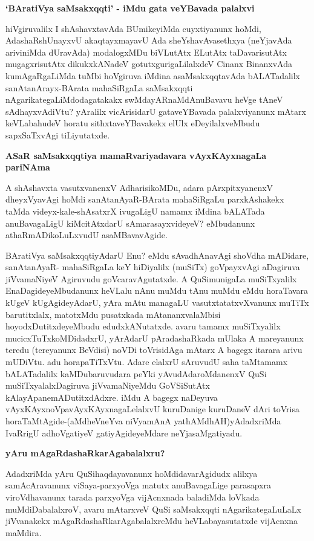 {\bigskip
\noindent
{\large\bf `BAratiVya saMsakxqqti' - iMdu gata veYBavada palalxvi}}\label{page23}
\medskip

\noindent
hiVgiruvalilx I shAshavxtavAda BUmikeyiMda cuyxtiyanunx hoMdi, AdashaR\-shUnayxvU akaqtayxmayavU Ada sheYshavAvasethxya (neYjavAda ariviniMda dUravAda) modalogxMDu biVLutAtx ELutAtx taDavari\-sutAtx mugagxrisutAtx dikukxkANadeV gotutx\-guri\-gaLilalxdeV Cinanx BinanxvAda kumAgaRgaLiMda tuMbi hoVgiruva iMdina asaMsakxqqta\-vAda bALATadalilx sanAtanArayx-BArata mahaSiRgaLa saMsakxqqti nAgarikategaLiMdodaga\-takakx swMdayARnaMdAnuBavavu heVge tAneV sAdhayxvAdiVtu? yAralilx vicArisi\-darU gataveYBavada palalxviyanunx mAtarx keVLabahudeV horatu sithxtaveYBavakekx elUlx eDeyilalxveMbudu sapxSaTxvAgi tiLiyu\-tatxde.

\newpage

{\medskip
\noindent
{\large\bf ASaR saMsakxqqtiya mamaRvariyadavara vAyxKAyxnagaLa pariNAma}}
\medskip

\noindent
A shAshavxta vasutxvanenxV AdharisikoMDu, adara pArxpitxyanenxV dheyxVyavAgi hoMdi sanAtanAyaR-\-BArata mahaSiRgaLu parxkAshakekx taMda videyx-kale-shAsatxrX ivugaLigU namamx iMdina bALATada anuBava\-gaLigU kiMci\-tAtxdarU sAmarasayxvideyeV? eMbudanunx athaRmADikoLuLxvudU asaMBavavAgide.

BAratiVya saMsakxqqtiyAdarU Enu? eMdu sAvadhAnavAgi shoVdha mADi\-dare, sanAtanAyaR-\- mahaSiRgaLa keY hiDiyalilx (muSiTx) goVpayxvAgi aDagiruva jiVvamaNiyeV Agiruvudu goVcara\-vAgu\-tatxde. A QuSimunigaLa muSiTxyalilx EnaDagideyeMbudanunx heVLalu nAnu muMdu tAnu muMdu eMdu horaTavara kUgeV kUgAgideyAdarU, yAra mAtu managaLU vasutxtatatxvXvanunx muTiTx baru\-titxlalx, matotxMdu pusatxkada mAtananxvalaMbisi hoyodxDutitxdeyeMbudu edudx\break kANutatxde. avaru tamamx muSiTxyalilx mucicxTuTxkoMDidadxrU, yArAdarU pAra\-dashaRkada mUlaka A mareyanunx teredu (tere\-yanunx BeVdisi) noVDi toVrisidAga mAtarx A bagegx itarara arivu mUDiVtu. adu hora\-paTiTxVtu. Adare elalxrU sAru\-vudU saha taMtamamx bALATadalilx kaMDubaruvudara peYki yAvu\-dAda\break\-roMdanenxV QuSi muSiTxyalalxDagiruva jiVvamaNiyeMdu GoVSiSutAtx kAla\break yApane\-mADu\-titxdAdxre. iMdu A bagegx naDeyuva vAyxKAyxnoVpavAyxKAyxna\-gaLelalxvU kuruDanige kuruDaneV dAri toVrisa horaTaMtA\-gide-(aMdheVneYva niVyamAnA yathAMdhAH\label{24})yAdadxriMda IvaRrigU adhoVgatiyeV gati\-yAgide\-yeMdare neYjasaMgatiyadu.

{\medskip
\noindent
{\large\bf yAru mAgaRdashaRkarAgabalalxru?}}
\medskip

\noindent
 AdadxriMda yAru QuSihaqdayavanunx hoMdidavarAgidudx alilxya samAcAra\-vanunx viSaya-parx\-yoVga matutx anuBavagaLige parasapxra viroVdhavanunx tarada parxyoVga vijAcnxnada baladiMda loVkada muMdiDa\-balalxroV, avaru mAtarxveV QuSi saMsakxqqti nAgarikategaLuLaLx jiVvanakekx mAgaRdashaRka\-rAga\-balalx\-reMdu heVLa\-bayasutatxde vijAcnxna maMdira.

